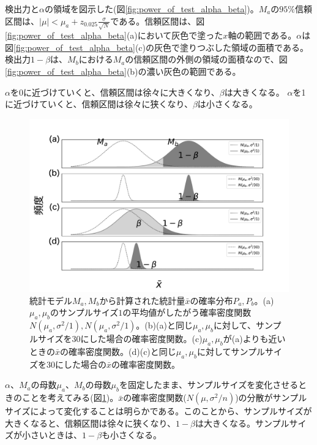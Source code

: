 検出力と$\alpha$の領域を図示した(図\ref{fig:power_of_test_alpha_beta})。$M_a$の$95\%$信頼区間は、$|\mu|<\mu_a+z_{0.025}\frac{\sigma}{\sqrt{N}}$である。信頼区間は、図\ref{fig:power_of_test_alpha_beta}(a)において灰色で塗った$x$軸の範囲である。$\alpha$は図\ref{fig:power_of_test_alpha_beta}(c)の灰色で塗りつぶした領域の面積である。
検出力$1-\beta$は、$M_b$における$M_a$の信頼区間の外側の領域の面積なので、図\ref{fig:power_of_test_alpha_beta}(b)の濃い灰色の範囲である。

$\alpha$を0に近づけていくと、信頼区間は徐々に大きくなり、$\beta$は大きくなる。
$\alpha$を1に近づけていくと、信頼区間は徐々に狭くなり、$\beta$は小さくなる。



\begin{figure}
    \begin{center}
        \includegraphics[width=15cm]{./image/04_/power_of_a_test_3.pdf}
        \caption{統計モデル$M_a,M_b$から計算された統計量$\bar{x}$の確率分布$P_a,P_b$。(a)$\mu_a,\mu_b$のサンプルサイズ$1$の平均値がしたがう確率密度関数$N(\mu_a,\sigma^2/1),N(\mu_a,\sigma^2/1)$。(b)(a)と同じ$\mu_a,\mu_b$に対して、サンプルサイズを$30$にした場合の確率密度関数。(c)$\mu_a,\mu_b$が(a)よりも近いときの$\bar{x}$の確率密度関数。(d)(c)と同じ$\mu_a,\mu_b$に対してサンプルサイズを$30$にした場合の$\bar{x}$の確率密度関数。}
        \label{fig:power_of_test_alpha_beta_sample_size}
    \end{center}
    \end{figure}

    

$\alpha$、$M_a$の母数$\mu_a$、$M_b$の母数$\mu_b$を固定したまま、サンプルサイズを変化させるときのことを考えてみる(図\ref{fig:power_of_test_alpha_beta_sample_size})。$\bar{x}$の確率密度関数($N(\mu,\sigma^2/n)$)の分散がサンプルサイズによって変化することは明らかである。このことから、サンプルサイズが大きくなると、信頼区間は徐々に狭くなり、$1-\beta$は大きくなる。サンプルサイズが小さいときは、$1-\beta$も小さくなる。


